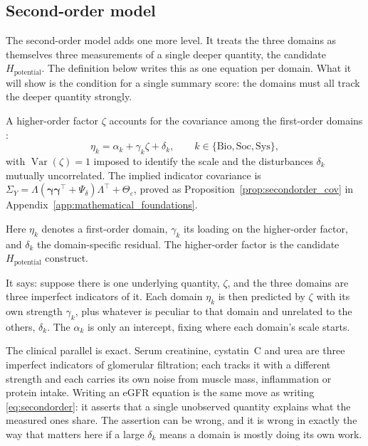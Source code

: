 \subsection{Second-order model}

The second-order model adds one more level. It treats the three domains as themselves three measurements of a single deeper quantity, the candidate $H_{\text{potential}}$. The definition below writes this as one equation per domain. What it will show is the condition for a single summary score: the domains must all track the deeper quantity strongly.


\begin{definition}
\label{def:secondorder}
A higher-order factor $\zeta$ accounts for the covariance among the first-order
domains \citep{bollen_1989}:
\begin{equation}
    \eta_k = \alpha_k + \gamma_k \zeta + \delta_k,
    \qquad k\in\{\mathrm{Bio},\mathrm{Soc},\mathrm{Sys}\},
    \label{eq:secondorder}
\end{equation}
with $\operatorname{Var}(\zeta)=1$ imposed to identify the scale and the
disturbances $\delta_k$ mutually uncorrelated. The implied indicator covariance
is $\Sigma_Y=\Lambda(\boldsymbol\gamma\boldsymbol\gamma^{\!\top}+\Psi_\delta)
\Lambda^{\!\top}+\Theta_\varepsilon$, proved as
Proposition~\ref{prop:secondorder_cov} in
Appendix~\ref{app:mathematical_foundations}.
\end{definition}

Here $\eta_k$ denotes a first-order domain, $\gamma_k$ its loading on the higher-order factor, and $\delta_k$ the domain-specific residual. The higher-order factor is the candidate $H_{\text{potential}}$ construct.

\begin{reading}
It says: suppose there is one underlying quantity, $\zeta$, and the three
domains are three imperfect indicators of it. Each domain $\eta_k$ is then
predicted by $\zeta$ with its own strength $\gamma_k$, plus whatever is
peculiar to that domain and unrelated to the others, $\delta_k$. The $\alpha_k$
is only an intercept, fixing where each domain's scale starts.

The clinical parallel is exact. Serum creatinine, cystatin~C and urea are three
imperfect indicators of glomerular filtration; each tracks it with a different
strength and each carries its own noise from muscle mass, inflammation or
protein intake. Writing an eGFR equation is the same move as writing
\eqref{eq:secondorder}: it asserts that a single unobserved quantity explains
what the measured ones share. The assertion can be wrong, and it is wrong in
exactly the way that matters here if a large $\delta_k$ means a domain is
mostly doing its own work.
\end{reading}

